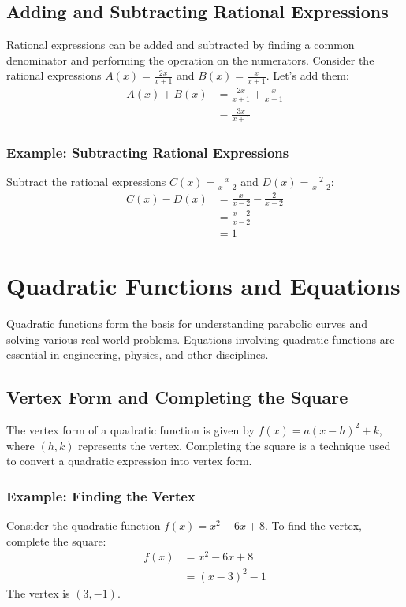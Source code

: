 \documentclass{article}
\newcommand{\boxedanswer}[1]{\fbox{\parbox{\textwidth}{#1}}}
\begin{document}
\subsection{Adding and Subtracting Rational Expressions}
Rational expressions can be added and subtracted by finding a common denominator and performing the operation on the numerators. Consider the rational expressions $A(x) = \frac{2x}{x + 1}$ and $B(x) = \frac{x}{x + 1}$. Let's add them:
\begin{align*}
    A(x) + B(x) &= \frac{2x}{x + 1} + \frac{x}{x + 1} \\
    &= \frac{3x}{x + 1}
\end{align*}

\subsubsection{Example: Subtracting Rational Expressions}
Subtract the rational expressions $C(x) = \frac{x}{x - 2}$ and $D(x) = \frac{2}{x - 2}$:
\begin{align*}
    C(x) - D(x) &= \frac{x}{x - 2} - \frac{2}{x - 2} \\
    &= \frac{x - 2}{x - 2} \\
    &= 1
\end{align*}
\boxedanswer{Answer: $C(x) - D(x) = 1$}

\section{Quadratic Functions and Equations}
Quadratic functions form the basis for understanding parabolic curves and solving various real-world problems. Equations involving quadratic functions are essential in engineering, physics, and other disciplines.

\subsection{Vertex Form and Completing the Square}
The vertex form of a quadratic function is given by $f(x) = a(x - h)^2 + k$, where $(h, k)$ represents the vertex. Completing the square is a technique used to convert a quadratic expression into vertex form.

\subsubsection{Example: Finding the Vertex}
Consider the quadratic function $f(x) = x^2 - 6x + 8$. To find the vertex, complete the square:
\begin{align*}
    f(x) &= x^2 - 6x + 8 \\
    &= (x - 3)^2 - 1
\end{align*}
The vertex is $(3, -1)$.
\end{document}
